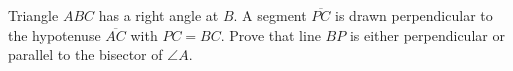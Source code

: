 Triangle $ABC$ has a right angle at $B$. A segment $\overline{PC}$ is drawn perpendicular to the hypotenuse $\overline{AC}$ with $PC=BC$. Prove that line $BP$ is either perpendicular or parallel to the bisector of $\angle A$.
